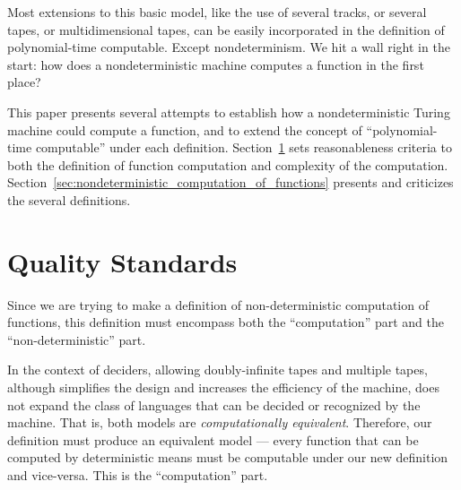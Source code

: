 \documentclass[12pt]{article}
\theoremstyle{definition}
\begin{document}
Most extensions to this basic model,
like the use of several tracks, or several tapes, or multidimensional tapes,
can be easily incorporated in the definition of polynomial-time computable.
Except nondeterminism.
We hit a wall right in the start:
how does a nondeterministic machine computes a function in the first place?

This paper presents several attempts to establish
how a nondeterministic Turing machine could compute a function,
and to extend the concept of ``polynomial-time computable'' under each definition.
Section~\ref{sec:quality-standards} sets reasonableness criteria
to both the definition of function computation and complexity of the computation.
Section~\ref{sec:nondeterministic_computation_of_functions}
presents and criticizes the several definitions.

\section{Quality Standards}
\label{sec:quality-standards}

Since we are trying to make a definition of non-deterministic computation of functions,
this definition must encompass both
the ``computation'' part and the ``non-deterministic'' part.

In the context of deciders,
allowing doubly-infinite tapes and multiple tapes,
although simplifies the design and increases the efficiency of the machine,
does not expand the class of languages that can be decided or recognized by the machine.
That is, both models are \emph{computationally equivalent}.
Therefore,
our definition must produce an equivalent model
--- every function that can be computed by deterministic means
must be computable under our new definition and vice-versa.
This is the ``computation'' part.
\end{document}
